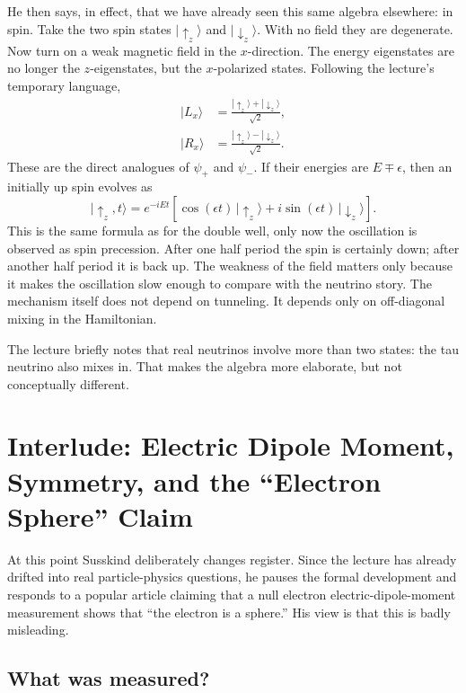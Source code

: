 He then says, in effect, that we have already seen this same algebra elsewhere: in spin. Take the two spin states \(|\uparrow_z\rangle\) and \(|\downarrow_z\rangle\). With no field they are degenerate. Now turn on a weak magnetic field in the \(x\)-direction. The energy eigenstates are no longer the \(z\)-eigenstates, but the \(x\)-polarized states. Following the lecture's temporary language,
\begin{align}
|L_x\rangle &= \frac{|\uparrow_z\rangle+|\downarrow_z\rangle}{\sqrt{2}},\\
|R_x\rangle &= \frac{|\uparrow_z\rangle-|\downarrow_z\rangle}{\sqrt{2}}.
\end{align}
These are the direct analogues of \(\psi_+\) and \(\psi_-\). If their energies are \(E\mp\epsilon\), then an initially up spin evolves as
\begin{equation}
|\uparrow_z,t\rangle
= e^{-iEt}\left[\cos(\epsilon t)\,|\uparrow_z\rangle
+ i\sin(\epsilon t)\,|\downarrow_z\rangle\right].
\end{equation}
This is the same formula as for the double well, only now the oscillation is observed as spin precession. After one half period the spin is certainly down; after another half period it is back up. The weakness of the field matters only because it makes the oscillation slow enough to compare with the neutrino story. The mechanism itself does not depend on tunneling. It depends only on off-diagonal mixing in the Hamiltonian.

The lecture briefly notes that real neutrinos involve more than two states: the tau neutrino also mixes in. That makes the algebra more elaborate, but not conceptually different.

\section{Interlude: Electric Dipole Moment, Symmetry, and the ``Electron Sphere'' Claim}

At this point Susskind deliberately changes register. Since the lecture has already drifted into real particle-physics questions, he pauses the formal development and responds to a popular article claiming that a null electron electric-dipole-moment measurement shows that ``the electron is a sphere.'' His view is that this is badly misleading.

\subsection{What was measured?}


